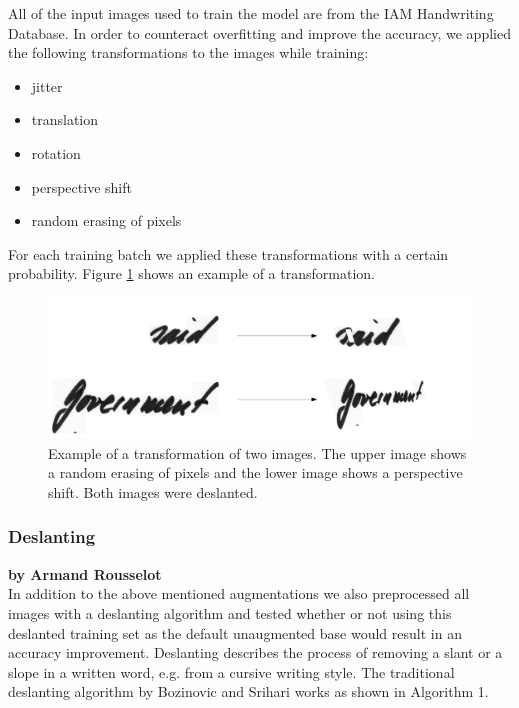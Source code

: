 \documentclass{article}
\begin{document}
All of the input images used to train the model are from the IAM Handwriting Database\cite{IAM}.
In order to counteract overfitting and improve the accuracy, we applied the following transformations to the images while training: 
\begin{itemize}
\item jitter
\item translation
\item rotation
\item perspective shift
\item random erasing of pixels
\end{itemize}
For each training batch we applied these transformations with a certain probability. Figure \ref{fig:augmentations} shows an example of a transformation.
\begin{figure}[H]
\begin{center}
\includegraphics[scale=0.3]{rsz_transform}
\end{center}
\caption{Example of a transformation of two images. The upper image shows a random erasing of pixels and the lower image shows a perspective shift. Both images were deslanted.}
\label{fig:augmentations}
\end{figure}

\subsubsection{Deslanting}

\textbf{by Armand Rousselot} \\


In addition to the above mentioned augmentations we also preprocessed all images with a deslanting algorithm and tested whether or not using this deslanted training set as the default unaugmented base would result in an accuracy improvement. Deslanting describes the process of removing a slant or a slope in a written word, e.g. from a cursive writing style. The traditional deslanting algorithm by Bozinovic and Srihari \cite{Bozinovic} works as shown in Algorithm 1.
\end{document}
